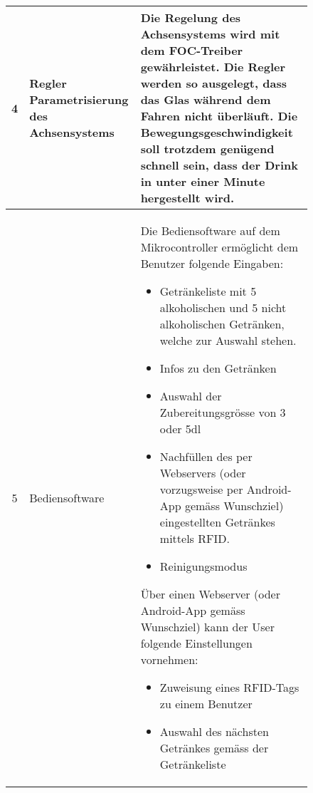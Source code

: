 \begin{figure}[H]
\begin{flushleft}
\begin{tabular}{|p{3cm}|p{3.25cm}|p{9.85cm}|}
\multicolumn{1}{|c|}{\cellcolor{green}4} & \cellcolor{green}Regler Parametrisierung des Achsensystems & \cellcolor{green}Die Regelung des Achsensystems wird mit dem FOC-Treiber gewährleistet. Die Regler werden so ausgelegt, dass das Glas während dem Fahren nicht überläuft. Die Bewegungsgeschwindigkeit soll trotzdem genügend schnell sein, dass der Drink in unter einer Minute hergestellt wird.\\ \hline

\multicolumn{1}{|c|}{\cellcolor{green}5} & \cellcolor{green}Bediensoftware & \cellcolor{green}Die Bediensoftware auf dem Mikrocontroller ermöglicht dem Benutzer folgende Eingaben:
\begin{itemize}
\item Getränkeliste mit 5 alkoholischen und 5 nicht alkoholischen Getränken, welche zur Auswahl stehen.
\item Infos zu den Getränken
\item Auswahl der Zubereitungsgrösse von 3 oder 5dl
\item Nachfüllen des per Webservers (oder vorzugsweise per Android-App gemäss Wunschziel) eingestellten Getränkes mittels RFID.
\item Reinigungsmodus
\end{itemize} 
Über einen Webserver (oder Android-App gemäss Wunschziel) kann der User folgende Einstellungen vornehmen:
\begin{itemize}
\item Zuweisung eines RFID-Tags zu einem Benutzer
\item Auswahl des nächsten Getränkes gemäss der Getränkeliste
\end{itemize}
		\end{tabular}
	\end{flushleft}
	\label{table:Pflichtziele}
	
\end{figure}
